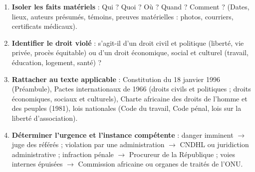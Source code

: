 \documentclass[11pt]{article}
\begin{document}
\begin{methode}
\begin{enumerate}
    \item \textbf{Isoler les faits matériels} : Qui ? Quoi ? Où ? Quand ? Comment ? (Dates, lieux, auteurs présumés, témoins, preuves matérielles : photos, courriers, certificats médicaux).
    \item \textbf{Identifier le droit violé} : s'agit-il d'un droit civil et politique (liberté, vie privée, procès équitable) ou d'un droit économique, social et culturel (travail, éducation, logement, santé) ?
    \item \textbf{Rattacher au texte applicable} : Constitution du 18 janvier 1996 (Préambule), Pactes internationaux de 1966 (droits civils et politiques ; droits économiques, sociaux et culturels), Charte africaine des droits de l'homme et des peuples (1981), lois nationales (Code du travail, Code pénal, lois sur la liberté d'association).
    \item \textbf{Déterminer l'urgence et l'instance compétente} : danger imminent $\rightarrow$ juge des référés ; violation par une administration $\rightarrow$ CNDHL ou juridiction administrative ; infraction pénale $\rightarrow$ Procureur de la République ; voies internes épuisées $\rightarrow$ Commission africaine ou organes de traités de l'ONU.
\end{enumerate}
\end{methode}
\end{document}
